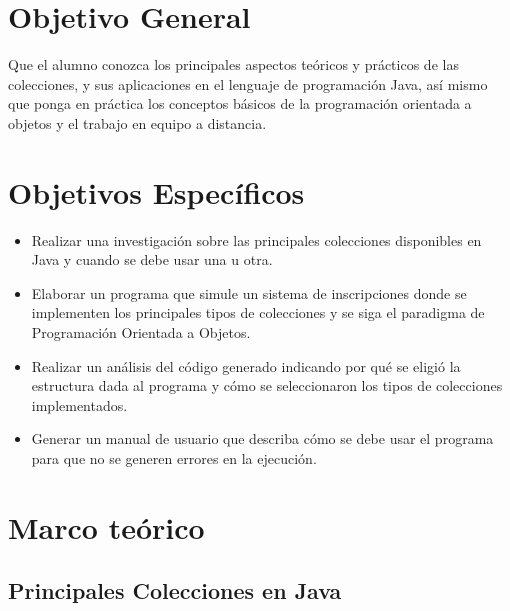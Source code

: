 \documentclass[12pt, letterpaper]{report}
\begin{document}
\setcounter{page}{1}

\tableofcontents
\newpage

\section*{Objetivo General}
Que el alumno conozca los principales aspectos teóricos y prácticos de las colecciones, y sus aplicaciones en el lenguaje de programación Java, así mismo que ponga en práctica los conceptos básicos de la programación orientada a objetos y el trabajo en equipo a distancia.

\section*{Objetivos Específicos}
\begin{itemize}
  \item Realizar una investigación sobre las principales colecciones disponibles en Java y cuando se debe usar una u otra.
  \item Elaborar un programa que simule un sistema de inscripciones donde se implementen los principales tipos de colecciones y se siga el paradigma de Programación Orientada a Objetos.
  \item Realizar un análisis del código generado indicando por qué se eligió la estructura dada al programa y cómo se seleccionaron los tipos de colecciones implementados. 
  \item Generar un manual de usuario que describa cómo se debe usar el programa para que no se generen errores en la ejecución.
\end{itemize}


\section*{Marco teórico}

\subsection*{Principales Colecciones en Java}
\end{document}
